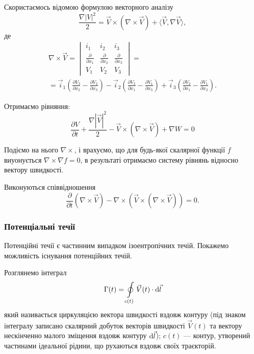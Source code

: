 Скористаємось відомою формулою векторного аналізу
\begin{equation}
	\frac{\nabla |V|^2}{2} = \vec V \times (\nabla \times \vec V) + \langle \vec V, \nabla \vec V \rangle,
\end{equation}
де
\begin{multline}
	\nabla \times \vec V = 
	\begin{vmatrix} 
		i_1 & i_2 & i_3 \\
		\frac{\partial}{\partial x_1} & \frac{\partial}{\partial x_2} & \frac{\partial}{\partial x_3} \\
		V_1 & V_2 & V_3
	\end{vmatrix} = \\
	= \vec i_1 \left( \frac{\partial V_3}{\partial x_2} - \frac{\partial V_2}{\partial x_3} \right) - \vec i_2 \left( \frac{\partial V_3}{\partial x_1} - \frac{\partial V_1}{\partial x_3} \right) + \vec i_3 \left( \frac{\partial V_2}{\partial x_1} - \frac{\partial V_1}{\partial x_2} \right).
\end{multline}

Отримаємо рівняння:
\begin{equation}
	\label{eq:3.3.64}
	\frac{\partial V}{\partial t} + \frac{\nabla \left| \vec V\right|^2}{2} - \vec V \times( \nabla \times \vec V) + \nabla W = 0
\end{equation}

Подіємо на нього $\nabla \times$, і врахуємо, що для будь-якої скалярної функції $f$ виуонується $\nabla \times \nabla f = 0$, в результаті отримаємо систему рівнянь відносно вектору швидкості.

\begin{th_equation}
	Виконуються співвідношення
	\begin{equation}
		\frac{\partial}{\partial t} \left(\nabla \times \vec V\right) - \nabla \times (\vec V \times (\nabla \times \vec V)) = 0.
	\end{equation}
\end{th_equation}

\subsubsection{Потенціальні течії}

Потенційні течії є частинним випадком ізоентропічних течій. Покажемо можливість існування потенційних течій. \medskip

Розглянемо інтеграл	
\begin{equation}
	\Gamma(t) = \displaystyle\oint\limits_{c(t)} \vec V(t) \cdot\mathop{}\!\mathrm{d} \vec l
\end{equation}
який називається циркуляцією вектора швидкості вздовж контуру (під знаком інтегралу записано скалярний добуток векторів швидкості $\vec V(t)$ та вектору нескінченно малого зміщення вздовж контуру $\mathop{}\!\mathrm{d} \vec l$); $c(t)$ --- контур, утворений частинами ідеальної рідини, що рухаються вздовж своїх траєкторій. \medskip

